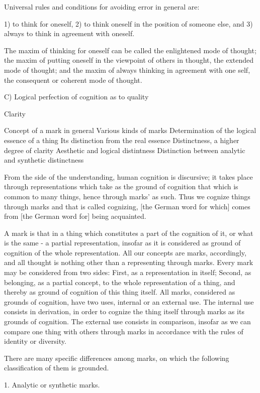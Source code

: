 Universal rules and conditions for avoiding error in general are:

1) to think for oneself,
2) to think oneself in the position of someone else, and
3) always to think in agreement with oneself.

The maxim of thinking for oneself can be called
the enlightened mode of thought;
the maxim of putting oneself in the viewpoint of others in thought,
the extended mode of thought;
and the maxim of always thinking in agreement with one self,
the consequent or coherent mode of thought.

C) Logical perfection of cognition as to quality

Clarity

    Concept of a mark in general
    Various kinds of marks
    Determination of the logical essence of a thing
    Its distinction from the real essence
    Distinctness, a higher degree of clarity
    Aesthetic and logical distintness
    Distinction between analytic and synthetic distinctness

From the side of the understanding, human cognition is discursive;
it takes place through representations which take as the ground of cognition
that which is common to many things, hence through marks' as such.
Thus we cognize things through marks and that is called cognizing,
[the German word for which] comes from [the German word for] being acquainted.

A mark is that in a thing which constitutes
a part of the cognition of it, or
what is the same - a partial representation,
insofar as it is considered as
ground of cognition of the whole representation.
All our concepts are marks, accordingly, and
all thought is nothing other than a representing through marks.
Every mark may be considered from two sides:
First, as a representation in itself;
Second, as belonging, as a partial concept, to
the whole representation of a thing, and thereby
as ground of cognition of this thing itself.
All marks, considered as grounds of cognition, have two uses,
internal or an external use.
The internal use consists in derivation,
in order to cognize the thing itself
through marks as its grounds of cognition.
The external use consists in comparison,
insofar as we can compare one thing with others
through marks in accordance with the rules of
identity or diversity.

There are many specific differences among marks,
on which the following classification of them is grounded.

1. Analytic or synthetic marks.

